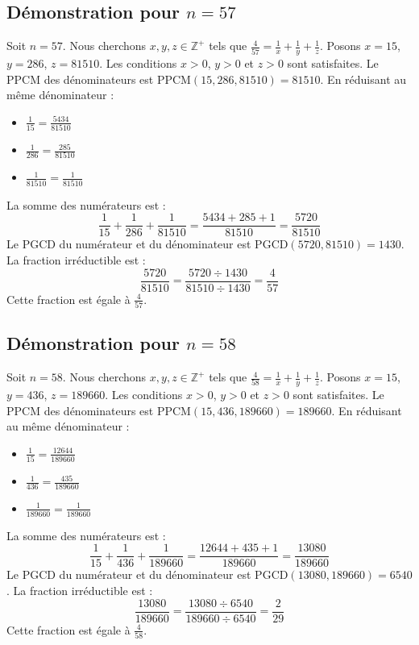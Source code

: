 \documentclass[11pt,a4paper]{article}
\begin{document}
\subsection{Démonstration pour $n = 57$}
Soit $n = 57$. Nous cherchons $x, y, z \in \mathbb{Z}^{+}$ tels que $\frac{4}{57} = \frac{1}{x} + \frac{1}{y} + \frac{1}{z}$.
Posons $x = 15$, $y = 286$, $z = 81510$.
Les conditions $x > 0$, $y > 0$ et $z > 0$ sont satisfaites.
Le PPCM des dénominateurs est $\text{PPCM}(15, 286, 81510) = 81510$.
En réduisant au même dénominateur :
\begin{itemize}
    \item $\frac{1}{15} = \frac{5434}{81510}$
    \item $\frac{1}{286} = \frac{285}{81510}$
    \item $\frac{1}{81510} = \frac{1}{81510}$
\end{itemize}
La somme des numérateurs est :
$$ \frac{1}{15} + \frac{1}{286} + \frac{1}{81510} = \frac{5434 + 285 + 1}{81510} = \frac{5720}{81510} $$
Le PGCD du numérateur et du dénominateur est $\text{PGCD}(5720, 81510) = 1430$.
La fraction irréductible est :
$$ \frac{5720}{81510} = \frac{5720 \div 1430}{81510 \div 1430} = \frac{4}{57} $$
Cette fraction est égale à $\frac{4}{57}$.

\subsection{Démonstration pour $n = 58$}
Soit $n = 58$. Nous cherchons $x, y, z \in \mathbb{Z}^{+}$ tels que $\frac{4}{58} = \frac{1}{x} + \frac{1}{y} + \frac{1}{z}$.
Posons $x = 15$, $y = 436$, $z = 189660$.
Les conditions $x > 0$, $y > 0$ et $z > 0$ sont satisfaites.
Le PPCM des dénominateurs est $\text{PPCM}(15, 436, 189660) = 189660$.
En réduisant au même dénominateur :
\begin{itemize}
    \item $\frac{1}{15} = \frac{12644}{189660}$
    \item $\frac{1}{436} = \frac{435}{189660}$
    \item $\frac{1}{189660} = \frac{1}{189660}$
\end{itemize}
La somme des numérateurs est :
$$ \frac{1}{15} + \frac{1}{436} + \frac{1}{189660} = \frac{12644 + 435 + 1}{189660} = \frac{13080}{189660} $$
Le PGCD du numérateur et du dénominateur est $\text{PGCD}(13080, 189660) = 6540$.
La fraction irréductible est :
$$ \frac{13080}{189660} = \frac{13080 \div 6540}{189660 \div 6540} = \frac{2}{29} $$
Cette fraction est égale à $\frac{4}{58}$.
\end{document}
